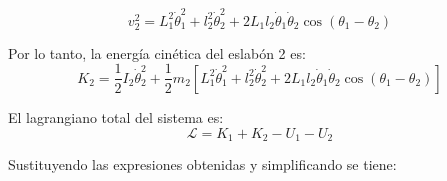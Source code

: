 

\begin{equation}
v_2^2 = L_1^2\dot{\theta}_1^2 + l_2^2\dot{\theta}_2^2 + 2L_1l_2\dot{\theta}_1\dot{\theta}_2\cos(\theta_1 - \theta_2)
\end{equation}

Por lo tanto, la energía cinética del eslabón 2 es:
\begin{equation}
K_2 = \frac{1}{2}I_2\dot{\theta}_2^2 + \frac{1}{2}m_2\left[L_1^2\dot{\theta}_1^2 + l_2^2\dot{\theta}_2^2 + 2L_1l_2\dot{\theta}_1\dot{\theta}_2\cos(\theta_1 - \theta_2)\right]
\end{equation}

El lagrangiano total del sistema es:
\begin{equation}
\mathcal{L} = K_1 + K_2 - U_1 - U_2
\end{equation}

Sustituyendo las expresiones obtenidas y simplificando se tiene:

